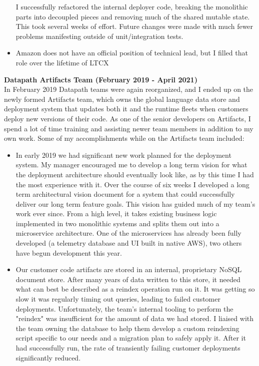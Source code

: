 \documentclass{res}
\begin{document}
\begin{resume}
\begin{itemize}
   I successfully refactored the internal deployer code, breaking the monolithic parts into decoupled pieces and removing much of the shared mutable state.  This took several weeks of effort.  Future changes were made with much fewer problems manifesting outside of unit/integration tests.
   \item Amazon does not have an official position of technical lead, but I filled that role over the lifetime of LTCX
   \end{itemize}
   {\bf Datapath Artifacts Team (February 2019 - April 2021) }\\
   In February 2019 Datapath teams were again reorganized, and I ended up on the newly formed Artifacts team, which owns the global language data store and deployment system that updates both it and the runtime fleets when customers deploy new versions of their code.  As one of the senior developers on Artifacts, I spend a lot of time training and assisting newer team members in addition to my own work.  Some of my accomplishments while on the Artifacts team included:
   \begin{itemize}
   \item In early 2019 we had significant new work planned for the deployment system.  My manager encouraged me to develop a long term vision for what the deployment architecture should eventually look like, as by this time I had the most experience with it.  Over the course of six weeks I developed a long term architectural vision document for a system that could successfully deliver our long term feature goals.  This vision has guided much of my team’s work ever since.  From a high level, it takes existing business logic implemented in two monolithic systems and splits them out into a microservice architecture.  One of the microservices has already been fully developed (a telemetry database and UI built in native AWS), two others have begun development this year.
   \item Our customer code artifacts are stored in an internal, proprietary NoSQL document store.  After many years of data written to this store, it needed what can best be described as a reindex operation run on it.  It was getting so slow it was regularly timing out queries, leading to failed customer deployments.  Unfortunately, the team’s internal tooling to perform the "reindex" was insufficient for the amount of data we had stored.  I liaised with the team owning the database to help them develop a custom reindexing script specific to our needs and a migration plan to safely apply it.  After it had successfully run, the rate of transiently failing customer deployments significantly reduced.

\end{itemize}
\end{resume}
\end{document}
